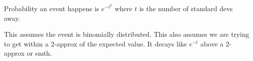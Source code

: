 \documentclass[12pt]{article}
\begin{document}
Probability an event happens is $e^{-t^2}$ where $t$ is the number
of standard devs away. 

This assumes the event is binomially distributed. This also
assumes we are trying to get within a $2$-approx of the expected
value. It decays like $e^{-t}$ above a $2$-approx or smth.
\end{document}
